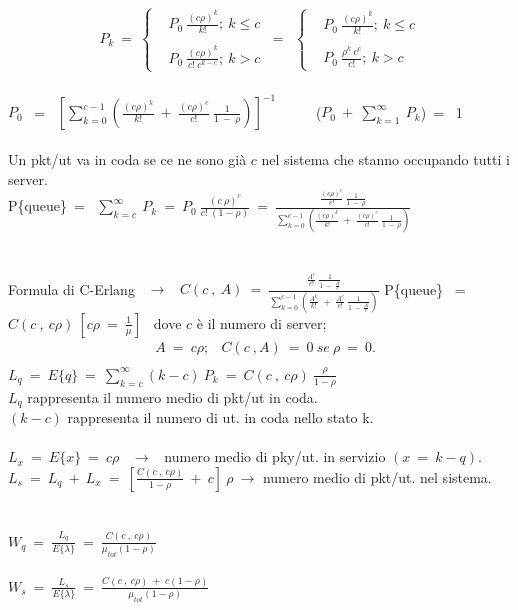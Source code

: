 \documentclass[12pt,a4paper]{article}
\begin{document}
    \begin{align*}
    P_{k} \ = \
    \begin{cases}
     &P_{0} \ \frac{(c\rho)^{k}}{k!};\ k \le c\\ \\
     &P_{0} \ \frac{(c\rho)^{k}}{c! \ c^{k-c}}; \ k > c
     \end{cases}
     \ = \ \
    \begin{cases}
     &P_{0} \ \frac{(c\rho)^{k}}{k!};\ k \le c\\ \\
     &P_{0} \ \frac{\rho^{k} \ c^{c}}{c!}; \ k > c
    \end{cases}
    \end{align*} \\
    $P_{0}$ \ = \ $[\sum^{c-1}_{k=0}(\frac{(c\rho)^{k}}{k!} \ + \ \frac{(c\rho)^{c}}{c!} \ \frac{1}{1 \ - \ \rho})]^{-1}$ \ \ \ \ \ ($P_{0} \ + \ \sum^{\infty}_{k=1} \ P_{k}$)\ = \ 1 \\ \\

    Un pkt/ut va in coda se ce ne sono già $c$ nel sistema che stanno occupando tutti i server. \\
    P\{queue\}\ = \ $\sum^{\infty}_{k=c} \ P_{k}\ = \ P_{0} \ \frac{(c \ \rho)^{c}}{c! \ (1 - \rho)} \ = \ \frac{\frac{(c \rho)^{c}}{c!} \ \frac{1}{1 \ - \ \rho}}{\sum^{c-1}_{k=0}(\frac{(c \rho)^{k}}{k!} \ + \ \frac{(c \rho)^{c}}{c!} \ \frac{1}{1 \ - \ \rho})}$ \\ \\ \\
    Formula di C-Erlang \ $\rightarrow$ \ $C(c \ , \ A) \ = \ \frac{\frac{A^{c}}{c!} \ \frac{1}{1 \ - \ \frac{A}{c}}}{\sum^{c-1}_{k=0}(\frac{A^{k}}{k!}\ + \ \frac{A^{c}}{c!} \ \frac{1}{1 \ - \ \frac{A}{c}})}$
    P\{queue\} \ = \ $C(c \ , \ c\rho) \ [c\rho \ = \ \frac{1}{\mu}]$ \ dove $c$ è il numero di server; \\
    \begin{align*}
    &A \ = \ c\rho; 
    &C(c \ , A) \ = \ 0 \ se \ \rho \ = \ 0. \\
    \end{align*}
    $L_{q} \ = \ E\{q\} \ = \ \sum^{\infty}_{k=c}(k-c) \ P_{k} \ = \ C(c \ , \ c\rho) \ \frac{\rho}{1-\rho}$ \\ 
    $L_{q}$ rappresenta il numero medio di pkt/ut in coda.\\
    $(k-c)$ rappresenta il numero di ut. in coda nello stato k.\\ \\
    $L_{x} \ = \ E\{x\} \ = \ c\rho$ \ $\rightarrow$ \ numero medio di pky/ut. in servizio $(x \ = \ k-q)$.
    $L_{s} \ = \ L_{q} \ + \ L_{x} \ = \ [\frac{C(c \ , \ c\rho)}{1-\rho} \ + \ c]\ \rho \ \rightarrow$ numero medio di pkt/ut. nel sistema. \\ \\ \\
    $W_{q} \ = \ \frac{L_{q}}{E\{\lambda\}} \ = \ \frac{C(c \ , \ c\rho)}{\mu_{tot}(1-\rho)}$ \\ \\
    $W_{s} \ = \ \frac{L_{s}}{E\{\lambda\}} \ = \ \frac{C(c \ , \ c\rho) \ + \ c(1-\rho)}{\mu_{tot}(1-\rho)}$ \\ 
    
\end{document}
